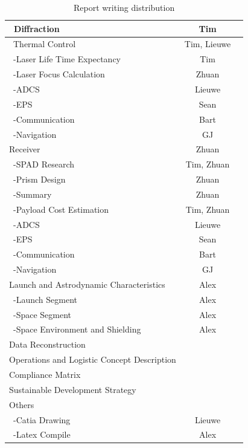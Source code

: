 \begin{table}[ht!]
\begin{tabular}{|l|c|c|}
 \ Diffraction                        & Tim &\\\hline
 \ Thermal Control                    & Tim, Lieuwe &\\\hline
 \ -Laser Life Time Expectancy        & Tim &\\\hline
 \ -Laser Focus Calculation           & Zhuan &\\\hline
 \ -ADCS                              & Lieuwe &\\\hline
 \ -EPS                               & Sean &\\\hline
 \ -Communication                     & Bart &\\\hline
 \ -Navigation                        & GJ &\\\hline
 Receiver                             & Zhuan &\\\hline
 \ -SPAD Research                     & Tim, Zhuan &\\\hline
 \ -Prism Design                      & Zhuan &\\\hline
 \ -Summary                           & Zhuan &\\\hline
 \ -Payload Cost Estimation           & Tim, Zhuan &\\\hline
 \ -ADCS                              & Lieuwe &\\\hline
 \ -EPS                               & Sean &\\\hline
 \ -Communication                     & Bart &\\\hline
 \ -Navigation                        & GJ &\\\hline
 Launch and Astrodynamic Characteristics & Alex &\\\hline
 \ -Launch Segment                    & Alex &\\\hline
 \ -Space Segment                     & Alex &\\\hline
 \ -Space Environment and Shielding   & Alex &\\\hline
 Data Reconstruction                  &\\\hline
 Operations and Logistic Concept Description&\\\hline
 Compliance Matrix                    &\\\hline
 Sustainable Development Strategy     &\\\hline
 Others                               &\\\hline
 \ -Catia Drawing                     & Lieuwe &\\\hline
 \ -Latex Compile                     & Alex &\\\hline
 \hline
\end{tabular}
\caption{Report writing distribution}
\label{tab:RWD}
\end{table}

